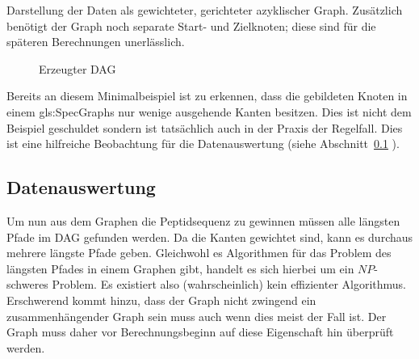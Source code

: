 \documentclass[a4paper, 12pt]{article}
\newcommand{\gerquot}[1]{\glqq#1\grqq}
\newcommand{\dashAndSpace}{\textendash \space}
\begin{document}
Darstellung der Daten als gewichteter, gerichteter azyklischer Graph. Zusätzlich benötigt der Graph noch separate Start- und Zielknoten; diese sind für die späteren Berechnungen unerlässlich.

\newcommand{\printVertices}[2]%
{%
   \Vertex[x=-8,y=0]{Start}
   \Vertex[x=8,y=0]{End}
   \foreach \x [count=\xi] in {#1}
   {%
      \foreach \y [count=\yi] in {#2}
      {%
         \ifthenelse{\xi=\yi}{
         \tikzstyle{VertexStyle}=[shape=circle,fill=\y,draw=black,line width=0.75pt]
         \Vertex[x=-7+\xi*2,y=0]{\x}}{\break}
      }
   }
}
\begin{figure}[htb]
   \centering
   \caption{Erzeugter DAG}
\end{figure}

Bereits an diesem Minimalbeispiel ist zu erkennen, dass die gebildeten Knoten in einem \glspl{gls:SpecGraph} nur wenige ausgehende Kanten besitzen. Dies ist nicht dem Beispiel geschuldet sondern ist tatsächlich auch in der Praxis der Regelfall. Dies ist eine hilfreiche Beobachtung für die Datenauswertung (siehe Abschnitt~\ref{Datenauswertung} \gerquot{}).


\subsection{Datenauswertung}\label{Datenauswertung}
Um nun aus dem Graphen die Peptidsequenz zu gewinnen müssen alle längsten Pfade im DAG gefunden werden. Da die Kanten gewichtet sind, kann es durchaus mehrere längste Pfade geben. Gleichwohl es Algorithmen für das Problem des längsten Pfades in einem Graphen gibt, handelt es sich hierbei um ein $NP$-schweres Problem. Es existiert also (wahrscheinlich) kein effizienter Algorithmus. Erschwerend kommt hinzu, dass der Graph nicht zwingend ein zusammenhängender Graph sein muss \dashAndSpace auch wenn dies meist der Fall ist. Der Graph muss daher vor Berechnungsbeginn auf diese Eigenschaft hin überprüft werden.
\end{document}
